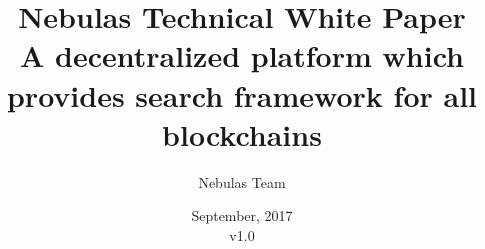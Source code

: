 \documentclass[11.5pt]{article}
\begin{document}
\renewcommand{\contentsname}{Contents}
\renewcommand{\abstractname}{Abstract}
\renewcommand{\refname}{References}
\renewcommand{\nomname}{Glossaries}
\renewcommand{\figurename}{Fig.}
\renewcommand{\tablename}{Table}
\renewcommand{\baselinestretch}{1.5}
\renewcommand{\appendixname}{Appendix}

\title{
	Nebulas Technical White Paper \\
	\large A decentralized platform which provides search framework for all blockchains}
\author{Nebulas Team}
\date{September, 2017\\v1.0}

\maketitle
\leavevmode \newline \newline \newline


\newpage
\tableofcontents
\newpage
\printnomenclature

\newpage



\newpage

\printbibliography

%
\end{document}

